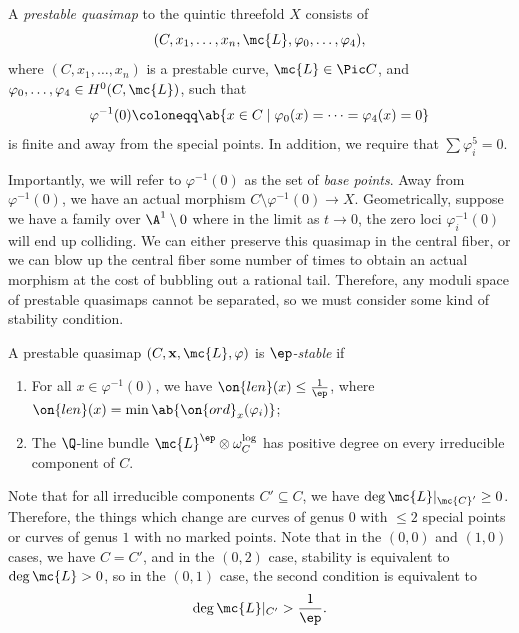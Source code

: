 \begin{defn}
    A \textit{prestable quasimap} to the quintic threefold \(X\) consists of 
    \[(C, x_1, \ldots, x_n, \mc{L}, \varphi_0, \ldots, \varphi_4),\] 
    where \((C, x_1, \ldots, x_n)\) is a prestable curve, \(\mc{L} \in \Pic C\), and \(\varphi_0, \ldots, \varphi_4 \in H^0(C, \mc{L})\), such that
    \[ \varphi^{-1}(0) \coloneqq \ab\{x \in C \mid \varphi_0(x) = \cdots = \varphi_4(x) = 0 \} \]
    is finite and away from the special points. In addition, we require that \(\sum \varphi_i^5 = 0\).
\end{defn}

Importantly, we will refer to \(\varphi^{-1}(0)\) as the set of \textit{base points}. Away from \(\varphi^{-1}(0)\), we have an actual morphism \(C \setminus \varphi^{-1}(0) \to X\). Geometrically, suppose we have a family over \(\A^1 \setminus 0\) where in the limit as \(t \to 0\), the zero loci \(\varphi_i^{-1}(0)\) will end up colliding. We can either preserve this quasimap in the central fiber, or we can blow up the central fiber some number of times to obtain an actual morphism at the cost of bubbling out a rational tail. Therefore, any moduli space of prestable quasimaps cannot be separated, so we must consider some kind of stability condition.

\begin{defn}
    A prestable quasimap \((C, \mathbf{x}, \mc{L}, \varphi)\) is \textit{\(\ep\)-stable} if
    \begin{enumerate}
        \item For all \(x \in \varphi^{-1}(0)\), we have \(\on{len}(x) \leq \frac{1}{\ep}\), where \(\on{len}(x) = \min \ab\{ \on{ord}_x (\varphi_i)\}\);
        \item The \(\Q\)-line bundle \(\mc{L}^{\ep} \otimes \omega_C^{\log}\) has positive degree on every irreducible component of \(C\).
    \end{enumerate}
\end{defn}

Note that for all irreducible components \(C' \subseteq C\), we have \(\deg \mc{L}|_{\mc{C}'} \geq 0\). Therefore, the things which change are curves of genus \(0\) with \(\leq 2\) special points or curves of genus \(1\) with no marked points. Note that in the \((0,0)\) and \((1,0)\) cases, we have \(C = C'\), and in the \((0,2)\) case, stability is equivalent to \(\deg \mc{L} > 0\), so in the \((0,1)\) case, the second condition is equivalent to 
\[ \deg \mc{L}|_{C'} > \frac{1}{\ep}. \]


